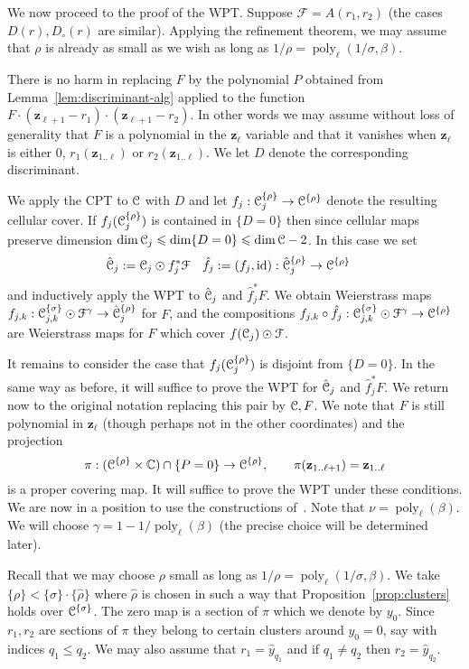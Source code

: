 \documentclass[reqno]{amsart}
\renewcommand\~[1]{\widetilde{#1}}
\def\poly{\operatorname{poly}} \def\J{\operatorname{J}}
\def\cF{{\mathcal F}} \def\cL{{\mathcal L}} \def\cR{{\mathcal R}}
\def\id{\operatorname{id}}
\def\vz{{\mathbf z}}
\def\he#1{{\{#1\}}}
\def\hrho{{\he\rho}}
\def\hsigma{{\he\sigma}}
\begin{document}
We now proceed to the proof of the WPT. Suppose $\cF=A(r_1,r_2)$ (the
cases $D(r),D_\circ(r)$ are similar). Applying the refinement theorem,
we may assume that $\rho$ is already as small as we wish as long as
$1/\rho=\poly_\ell(1/\sigma,\beta)$.

There is no harm in replacing $F$ by the polynomial $P$ obtained from
Lemma~\ref{lem:discriminant-alg} applied to the function
$F\cdot(\vz_{\ell+1}-r_1)\cdot(\vz_{\ell+1}-r_2)$. In other words we
may assume without loss of generality that $F$ is a polynomial in the
$\vz_\ell$ variable and that it vanishes when $\vz_\ell$ is either
$0$, $r_1(\vz_{1..\ell})$ or $r_2(\vz_{1..\ell})$. We let $D$ denote
the corresponding discriminant.

We apply the CPT to ${\mathcal C}$ with $D$ and let
$f_j:\cC^\hrho_j\to\cC^\hrho$ denote the resulting cellular cover. If
$f_j(\cC_j^\hrho)$ is contained in $\{D=0\}$ then since cellular maps
preserve dimension $\dim{\mathcal C}_j\leqslant\dim\{D=0\}\leqslant\dim{\mathcal C}-2$. In this case
we set
\begin{align}
  \hat\cC_j&:=\cC_j\odot f_j^*\cF & \hat f_j&:=(f_j,\id):\hat\cC_j^\hrho\to\cC^\hrho
\end{align}
and inductively apply the WPT to $\hat{{\mathcal C}}_j$ and $\hat f_j^*F$. We
obtain Weierstrass maps
$f_{j,k}:\cC^\hsigma_{j,k}\odot\cF^\gamma\to\hat\cC_j^\hrho$ for $F$,
and the compositions
$f_{j,k}\circ\hat f_j:\cC^\hsigma_{j,k}\odot\cF^\gamma\to\cC^\hrho$
are Weierstrass maps for $F$ which cover $f(\cC_j)\odot\cF$.

It remains to consider the case that $f_j(\cC_j^\hrho)$ is disjoint
from $\{D=0\}$. In the same way as before, it will suffice to prove
the WPT for $\hat{{\mathcal C}}_j$ and $\hat f_j^*F$. We return now to the
original notation replacing this pair by ${\mathcal C},F$.  We note that $F$ is
still polynomial in $\vz_\ell$ (though perhaps not in the other
coordinates) and the projection
\begin{equation}
  \pi:(\cC^\hrho\times\C)\cap\{P=0\}\to\cC^\hrho, \qquad \pi(\vz_{1..\ell+1})=\vz_{1..\ell}
\end{equation}
is a proper covering map. It will suffice to prove the WPT under these
conditions. We are now in a position to use the constructions
of~. Note that
$\nu=\poly_\ell(\beta)$. We will choose $\gamma=1-1/\poly_\ell(\beta)$
(the precise choice will be determined later).

Recall that we may choose $\rho$ small as long as
$1/\rho=\poly_\ell(1/\sigma,\beta)$. We take
$\hrho<\hsigma\cdot\he{\hat\rho}$ where $\hat\rho$ is chosen in such a
way that Proposition~\ref{prop:clusters} holds over $\cC^\hsigma$. The
zero map is a section of $\pi$ which we denote by $y_0$. Since
$r_1,r_2$ are sections of $\pi$ they belong to certain clusters around
$y_0=0$, say with indices $q_1\le q_2$. We may also assume that
$r_1=\hat y_{q_1}$ and if $q_1\neq q_2$ then $r_2=\hat y_{q_2}$.
\end{document}
